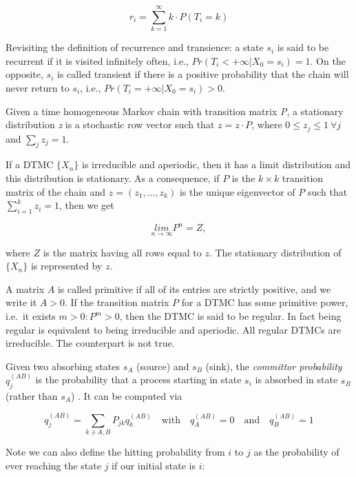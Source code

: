 \documentclass[
  nojss]{jss}
\begin{document}
\[
 r_i = \sum_{k = 1}^{\infty} k \cdot P(T_i = k)
\]

Revisiting the definition of recurrence and transience: a state \(s_{i}\) is said to be recurrent if it is visited infinitely often, i.e., \(Pr(T_{i}<+\infty|X_{0}=s_{i})=1\). On the opposite, \(s_{i}\) is called transient if there is a positive probability that the chain will never return to \(s_{i}\), i.e., \(Pr(T_{i}=+\infty|X_{0}=s_{i})>0\).

Given a time homogeneous Markov chain with transition matrix \emph{P}, a stationary distribution \emph{z} is a stochastic row vector such that \(z=z\cdot P\), where \(0\leq z_{j}\leq 1 \: \forall j\) and \(\sum_{j}z_{j}=1\).

If a DTMC \(\{X_{n}\}\) is irreducible and aperiodic, then it has a limit distribution and this distribution is stationary. As a consequence, if \(P\) is the \(k\times k\) transition matrix of the chain and \(z=\left(z_{1},...,z_{k}\right)\) is the unique eigenvector of \(P\) such that \(\sum_{i=1}^{k}z_{i}=1\), then we get

\begin{equation}
  \underset{n\rightarrow\infty}{lim}P^{n}=Z,
  \label{eq:limMc}
\end{equation}

where \(Z\) is the matrix having all rows equal to \(z\). The stationary distribution of \(\{X_{n}\}\) is represented by \(z\).

A matrix \(A\) is called primitive if all of its entries are strictly positive, and we write it \(A > 0\). If the transition matrix \(P\) for a DTMC has some primitive power, i.e.~it exists \(m > 0: P^m > 0\), then the DTMC is said to be regular. In fact being regular is equivalent to being irreducible and aperiodic. All regular DTMCs are irreducible. The counterpart is not true.

Given two absorbing states \(s_A\) (source) and \(s_B\) (sink), the \emph{committor probability} \(q_j^{(AB)}\) is the probability that a process starting in state \(s_i\) is absorbed in state \(s_B\) (rather than \(s_A\)) \citep{noe_constructing_2009}. It can be computed via

\begin{equation}
 q_j^{(AB)} = \sum_{k \ni {A, B}} P_{jk}q_k^{(AB)} \quad \mbox{with} \quad
 q_A^{(AB)} = 0 \quad \mbox{and} \quad  q_B^{(AB)} = 1
\end{equation}

Note we can also define the hitting probability from \(i\) to \(j\) as the probability of ever reaching the state \(j\) if our initial state is \(i\):
\end{document}

